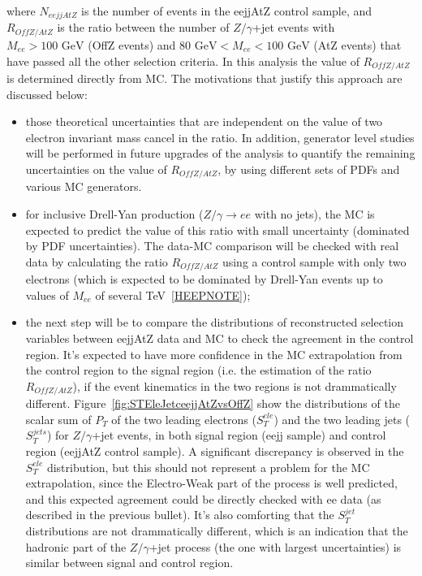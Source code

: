 where $N_{eejjAtZ}$ is the number of events in the eejjAtZ control sample, and 
$R_{OffZ/AtZ}$ is the ratio between the number of $Z/\gamma$+jet events 
with $M_{ee} > 100\mbox{ GeV}$ (OffZ events) and $80\mbox{ GeV} < M_{ee} < 100\mbox{ GeV}$ 
(AtZ events) that have passed all the other selection criteria.
In this analysis the value of $R_{OffZ/AtZ}$ is determined directly from MC.
The motivations that justify this approach are discussed below:
%
\begin{itemize}
%
\item those theoretical uncertainties that are independent 
on the value of two electron invariant mass cancel in the ratio.
In addition, generator level studies will be performed 
in future upgrades of the analysis to quantify the
remaining uncertainties on the value of $R_{OffZ/AtZ}$, 
by using different sets of PDFs and various MC generators.
%
%
\item for inclusive Drell-Yan production ($Z/\gamma \rightarrow ee$ with no jets), 
the MC is expected to predict the value of this ratio with small 
uncertainty (dominated by PDF uncertainties). 
The data-MC comparison will be checked with real data by calculating 
the ratio $R_{OffZ/AtZ}$ using a control sample with only two electrons 
(which is expected to be dominated by Drell-Yan events 
up to values of $M_{ee}$ of several TeV~\ref{HEEPNOTE});
%
\item the next step will be to compare the distributions of reconstructed selection 
variables between eejjAtZ data and MC to check the agreement in the control region.
It's expected to have more confidence in the MC extrapolation 
from the control region to the signal region (i.e. the estimation of the ratio $R_{OffZ/AtZ}$), 
if the event kinematics in the two regions is not drammatically different.
Figure~\ref{fig:STEleJetceejjAtZvsOffZ}
show the distributions of the scalar sum of $P_{T}$ of the two leading electrons ($S_{T}^{ele}$) 
and the two leading jets ($S_{T}^{jets}$) for $Z/\gamma$+jet events, 
in both signal region (eejj sample) and control region (eejjAtZ control sample). 
A significant discrepancy is observed 
in the $S_{T}^{ele}$ distribution, but this should not represent 
a problem for the MC extrapolation, since the Electro-Weak part of the process 
is well predicted, and this expected agreement could be directly checked with ee data 
(as described in the previous bullet).
It's also comforting that the $S_{T}^{jet}$ distributions are not drammatically different, 
which is an indication that the hadronic part of the $Z/\gamma$+jet process 
(the one with largest uncertainties) is similar between 
signal and control region.  
%
\end{itemize}

